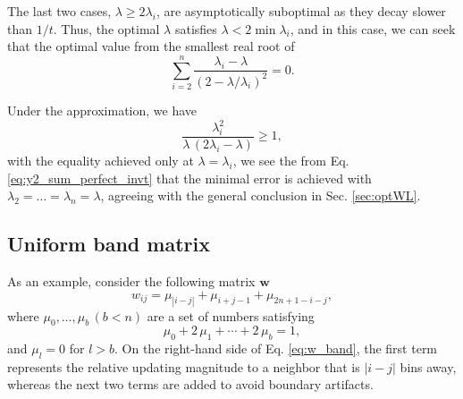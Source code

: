 \documentclass[reprint]{revtex4-1}
\begin{document}
%
The last two cases, $\lambda \ge 2\lambda_i$,
are asymptotically suboptimal
as they decay slower than $1/t$.
%
Thus, the optimal $\lambda$
satisfies $\lambda < 2 \min \lambda_i$,
and in this case,
we can seek that
the optimal value from
the smallest real root of
%
\begin{equation}
\sum_{i = 2}^n
\frac{ \lambda_i - \lambda }
{ \left(2 - \lambda/ \lambda_i \right)^2 }
= 0.
\label{eq:optimal_lambda_approx}
\end{equation}



Under the approximation, we have
$$
\frac{ \lambda_i^2 }{ \lambda \, (2 \lambda_i - \lambda) } \ge 1,
$$
with the equality achieved only at $\lambda = \lambda_i$,
we see the from Eq. \eqref{eq:y2_sum_perfect_invt}
that the minimal error is achieved with
$\lambda_2 = \dots = \lambda_n = \lambda$,
agreeing with the general conclusion
in Sec. \ref{sec:optWL}.




\subsection{\label{sec:band-matrix}
Uniform band matrix}



As an example, consider the following matrix $\mathbf w$
%
\begin{equation}
  w_{ij} = \mu_{|i-j|} + \mu_{i+j-1} + \mu_{2n+1-i-j},
  \label{eq:w_band}
\end{equation}
%
where $\mu_0, \dots, \mu_b \, (b < n)$
are a set of numbers satisfying
%
\begin{equation}
\mu_0 + 2 \, \mu_1 + \cdots + 2 \, \mu_b = 1,
\label{eq:m_normalization}
\end{equation}
%
and $\mu_l = 0$ for $l > b$.
%
On the right-hand side of Eq. \eqref{eq:w_band},
the first term represents the relative updating magnitude
to a neighbor that is $|i - j|$ bins away,
whereas the next two terms are added to avoid
boundary artifacts.
\end{document}
